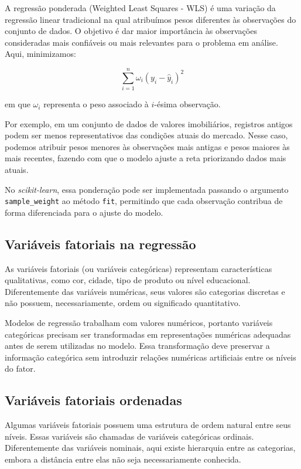\documentclass{article}
\begin{document}
A regressão ponderada (Weighted Least Squares - WLS) é uma variação 
da regressão linear tradicional na qual atribuímos pesos diferentes 
às observações do conjunto de dados. O objetivo é dar maior importância 
às observações consideradas mais confiáveis ou mais relevantes para 
o problema em análise. Aqui, minimizamos:

\begin{equation}
    \sum_{i = 1}^{n} \omega_i (y_i - \hat{y}_i)^2
\end{equation}

em que $\omega_i$ representa o peso associado à $i$-ésima observação. 

Por exemplo, em um conjunto de dados de valores imobiliários, registros 
antigos podem ser menos representativos das condições atuais do mercado.
Nesse caso, podemos atribuir pesos menores às observações mais antigas 
e pesos maiores às mais recentes, fazendo com que o modelo ajuste a reta 
priorizando dados mais atuais.

No \textit{scikit-learn}, essa ponderação pode ser implementada passando 
o argumento \texttt{sample\_weight} ao método \texttt{fit}, permitindo que 
cada observação contribua de forma diferenciada para o ajuste do modelo.

\subsection{Variáveis fatoriais na regressão}

As variáveis fatoriais (ou variáveis categóricas) representam características qualitativas,
como cor, cidade, tipo de produto ou nível educacional. Diferentemente das variáveis
numéricas, seus valores são categorias discretas e não possuem, necessariamente,
ordem ou significado quantitativo.

Modelos de regressão trabalham com valores numéricos, portanto variáveis categóricas
precisam ser transformadas em representações numéricas adequadas antes de serem
utilizadas no modelo. Essa transformação deve preservar a informação categórica
sem introduzir relações numéricas artificiais entre os níveis do fator.

\subsection{Variáveis fatoriais ordenadas}

Algumas variáveis fatoriais possuem uma estrutura de ordem natural entre
seus níveis. Essas variáveis são chamadas de variáveis categóricas ordinais.
Diferentemente das variáveis nominais, aqui existe hierarquia entre as categorias,
embora a distância entre elas não seja necessariamente conhecida.
\end{document}
